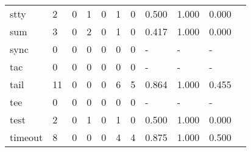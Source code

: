 \begin{longtable}{lp{1.10cm}p{1.10cm}p{1.10cm}p{1.10cm}p{1.10cm}p{1.10cm}p{1.10cm}p{1.10cm}p{1.10cm}p{1.10cm}}
stty      &                      2 &                                  0 &                                 1 &                                0 &                                 1 &                               0 &                          0.500 &                                 1.000 &                               0.000 \\
sum       &                      3 &                                  0 &                                 2 &                                0 &                                 1 &                               0 &                          0.417 &                                 1.000 &                               0.000 \\
sync      &                      0 &                                  0 &                                 0 &                                0 &                                 0 &                               0 &                              - &                                     - &                                   - \\
tac       &                      0 &                                  0 &                                 0 &                                0 &                                 0 &                               0 &                              - &                                     - &                                   - \\
tail      &                     11 &                                  0 &                                 0 &                                0 &                                 6 &                               5 &                          0.864 &                                 1.000 &                               0.455 \\
tee       &                      0 &                                  0 &                                 0 &                                0 &                                 0 &                               0 &                              - &                                     - &                                   - \\
test      &                      2 &                                  0 &                                 1 &                                0 &                                 1 &                               0 &                          0.500 &                                 1.000 &                               0.000 \\
timeout   &                      8 &                                  0 &                                 0 &                                0 &                                 4 &                               4 &                          0.875 &                                 1.000 &                               0.500 \\

\end{longtable}

